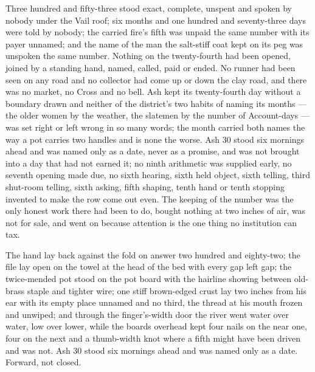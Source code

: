 Three hundred and fifty-three stood exact, complete, unspent and spoken by nobody under the Vail roof; six months and one hundred and seventy-three days were told by nobody; the carried fire’s fifth was unpaid the same number with its payer unnamed; and the name of the man the salt-stiff coat kept on its peg was unspoken the same number. Nothing on the twenty-fourth had been opened, joined by a standing hand, named, called, paid or ended. No runner had been seen on any road and no collector had come up or down the clay road, and there was no market, no Cross and no bell. Ash kept its twenty-fourth day without a boundary drawn and neither of the district’s two habits of naming its months --- the older women by the weather, the slatemen by the number of Account-days --- was set right or left wrong in so many words; the month carried both names the way a pot carries two handles and is none the worse. Ash 30 stood six mornings ahead and was named only as a date, never as a promise, and was not brought into a day that had not earned it; no ninth arithmetic was supplied early, no seventh opening made due, no sixth hearing, sixth held object, sixth telling, third shut-room telling, sixth asking, fifth shaping, tenth hand or tenth stopping invented to make the row come out even. The keeping of the number was the only honest work there had been to do, bought nothing at two inches of air, was not for sale, and went on because attention is the one thing no institution can tax.

The hand lay back against the fold on answer two hundred and eighty-two; the file lay open on the towel at the head of the bed with every gap left gap; the twice-mended pot stood on the pot board with the hairline showing between old-brass staple and tighter wire; one stiff brown-edged crust lay two inches from his ear with its empty place unnamed and no third, the thread at his mouth frozen and unwiped; and through the finger’s-width door the river went water over water, low over lower, while the boards overhead kept four nails on the near one, four on the next and a thumb-width knot where a fifth might have been driven and was not. Ash 30 stood six mornings ahead and was named only as a date. Forward, not closed.
